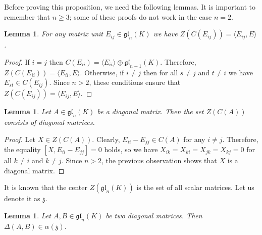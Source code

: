 \documentclass[a4paper,reqno,12pt]{amsart}
\newtheorem{lemma}[proposition]{Lemma}
\theoremstyle{definition}
\theoremstyle{remark}
\def\zzz{\mathfrak{z}}
\def\gl{\mathfrak{gl}}
\renewcommand{\ge}{\geqslant}
\begin{document}
	Before proving this proposition, we need the following lemmas. It is important to remember that $n \ge 3$; some of these proofs do not work in the case $n = 2$.

	\begin{lemma}
		For any matrix unit $E_{ij} \in \gl_n(K)$ we have $Z(C(E_{ij})) = \langle E_{ij}, E \rangle$.
	\end{lemma}

	\begin{proof}
		If $i = j$ then $C(E_{ii}) = \langle E_{ii} \rangle \oplus \gl_{n - 1}(K)$. Therefore, $Z(C(E_{ii})) = \langle E_{ii}, E \rangle$. Otherwise, if $i \neq j$ then for all $s \neq j$ and $t \neq i$ we have $E_{st} \in C(E_{ij})$. Since $n > 2$, these conditions ensure that $Z(C(E_{ij})) = \langle E_{ij}, E \rangle$. 
	\end{proof}
	
	\begin{lemma}\label{lemma:ZCForDiag}
		Let $A \in \gl_n(K)$ be a diagonal matrix. Then the set $Z(C(A))$ consists of diagonal matrices.
	\end{lemma}

	\begin{proof}
		Let $X \in Z(C(A))$. Clearly, $E_{ii} - E_{jj} \in C(A)$ for any $i \neq j$. Therefore, the equality $[X, E_{ii} - E_{jj}] = 0$ holds, so we have $X_{ik} = X_{ki} = X_{jk} = X_{kj} = 0$ for all $k \neq i$ and $k \neq j$. Since $n > 2$, the previous observation shows that $X$ is a diagonal matrix.
	\end{proof}

	It is known that the center $Z(\gl_n(K))$ is the set of all scalar matrices. Let us denote it as $\zzz$.

	\begin{lemma}\label{lemma:additivityForBothDiag}
		Let $A, B \in \gl_n(K)$ be two diagonal matrices. Then $\Delta(A, B) \in \alpha(\zzz)$.
	\end{lemma}
\end{document}
